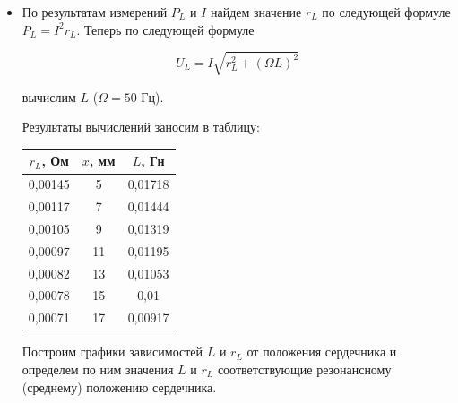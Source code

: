 \documentclass[a4paper, 12pt]{article}%
\begin{document}
\begin{itemize}

\item По результатам измерений $P_L$ и $I$ найдем значение $r_L$ по следующей формуле $P_L = I^2r_L $. Теперь по следующей формуле 

\begin{equation}
U_L = I \sqrt{r_L^2 + (\Omega L)^2}
\end{equation}

вычислим $L$ ($\Omega = 50$ Гц).

Результаты вычислений заносим в таблицу:


\begin{table}[!h]
\begin{center}
\begin{tabular}{|c|c|c|}
\hline $r_L$, Ом & $x$, мм & $L$, Гн\\
\hline 0,00145 & 5 & 0,01718 \\
\hline 0,00117 & 7 & 0,01444 \\
\hline 0,00105 & 9 & 0,01319 \\
\hline 0,00097 & 11 & 0,01195 \\
\hline 0,00082 & 13 & 0,01053 \\
\hline 0,00078 & 15 & 0,01 \\
\hline 0,00071 & 17 & 0,00917 \\
\hline
\end{tabular}
\end{center} 
\end{table}


Построим графики зависимостей $L$ и $r_L$ от положения сердечника и определем по ним значения $L$ и 
$r_L$ соответствующие резонансному (среднему) положению сердечника.


\begin{center}

\begin{figure}[h]
\end{figure}


\end{center}
\end{itemize}
\end{document}
